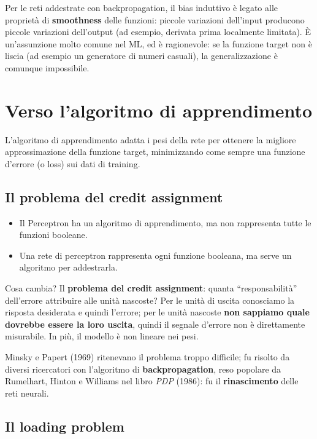 Per le reti addestrate con backpropagation, il bias induttivo è legato
alle proprietà di \textbf{smoothness} delle funzioni: piccole variazioni
dell'input producono piccole variazioni dell'output (ad esempio,
derivata prima localmente limitata). È un'assunzione molto comune nel
ML, ed è ragionevole: se la funzione target non è liscia (ad esempio un
generatore di numeri casuali), la generalizzazione è comunque
impossibile.

\section{Verso l'algoritmo di
apprendimento}\label{verso-lalgoritmo-di-apprendimento}

L'algoritmo di apprendimento adatta i pesi della rete per ottenere la
migliore approssimazione della funzione target, minimizzando come sempre
una funzione d'errore (o loss) sui dati di training.

\subsection{Il problema del credit
assignment}\label{il-problema-del-credit-assignment}

\begin{itemize}
\tightlist
\item
  Il Perceptron ha un algoritmo di apprendimento, ma non rappresenta
  tutte le funzioni booleane.
\item
  Una rete di perceptron rappresenta ogni funzione booleana, ma serve un
  algoritmo per addestrarla.
\end{itemize}

Cosa cambia? Il \textbf{problema del credit assignment}: quanta
``responsabilità'' dell'errore attribuire alle unità nascoste? Per le
unità di uscita conosciamo la risposta desiderata e quindi l'errore; per
le unità nascoste \textbf{non sappiamo quale dovrebbe essere la loro
uscita}, quindi il segnale d'errore non è direttamente misurabile. In
più, il modello è non lineare nei pesi.

Minsky e Papert (1969) ritenevano il problema troppo difficile; fu
risolto da diversi ricercatori con l'algoritmo di
\textbf{backpropagation}, reso popolare da Rumelhart, Hinton e Williams
nel libro \emph{PDP} (1986): fu il \textbf{rinascimento} delle reti
neurali.

\subsection{Il loading problem}\label{il-loading-problem}

